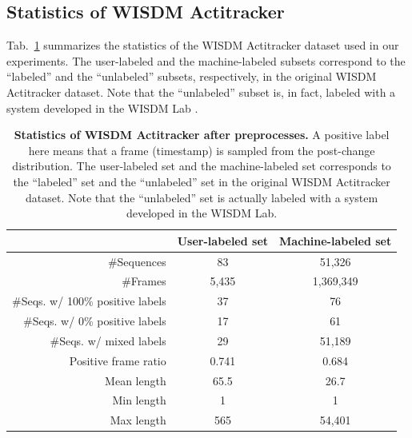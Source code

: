 \documentclass{article}
\theoremstyle{plain}
\theoremstyle{definition}
\theoremstyle{remark}
\begin{document}
\subsection{Statistics of WISDM Actitracker} \label{app:Statistics of WISDM Actitracker}
Tab.~\ref{tab:WISDMstatistics_appendix} summarizes the statistics of the WISDM Actitracker dataset used in our experiments.
The user-labeled and the machine-labeled subsets correspond to the ``labeled'' and the ``unlabeled'' subsets, respectively, in the original WISDM Actitracker dataset. 
Note that the ``unlabeled'' subset is, in fact, labeled with a system developed in the WISDM Lab \citep{kwapisz2011activity_WISDM_Actitracker_dataset}.
\begin{table}[tbp]
\centering
\begin{tabular}{rcc}
                                     & User-labeled set & Machine-labeled set \\
    \hline
    \#Sequences                      & 83    & 51,326 \\
    \#Frames                         & 5,435 & 1,369,349 \\
    \#Seqs. w/ 100\% positive labels & 37    & 76 \\
    \#Seqs. w/ 0\% positive labels   & 17    & 61 \\
    \#Seqs. w/ mixed labels          & 29    & 51,189 \\
    Positive frame ratio             & 0.741 & 0.684 \\
    Mean length                      & 65.5  & 26.7 \\
    Min length                       & 1     & 1 \\
    Max length                       & 565   & 54,401 
\end{tabular}
\caption{
    \textbf{Statistics of WISDM Actitracker after preprocesses.} A positive label here means that a frame (timestamp) is sampled from the post-change distribution.
    The user-labeled set and the machine-labeled set corresponds to the ``labeled'' set and the ``unlabeled'' set in the original WISDM Actitracker dataset. 
    Note that the ``unlabeled'' set is actually labeled with a system developed in the WISDM Lab.
}
\label{tab:WISDMstatistics_appendix}
\end{table}
\end{document}
